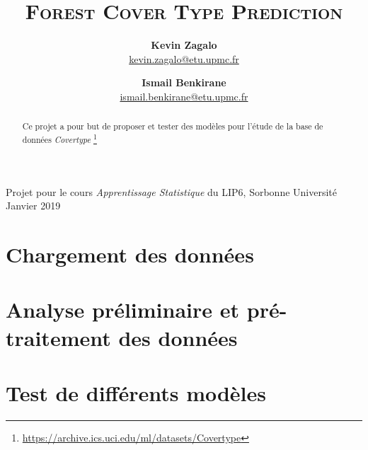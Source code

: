 \documentclass[12pt,a4paper]{article}
\title{\scshape \huge Forest Cover Type Prediction}
\author{\textbf{Kevin Zagalo} \\  \url{kevin.zagalo@etu.upmc.fr}  \and \textbf{Ismail Benkirane} \\ \url{ismail.benkirane@etu.upmc.fr}}
\date{}
\numberwithin{equation}{section}
\begin{document}
	\maketitle
	
{\small Projet pour le cours \textit{Apprentissage Statistique} du LIP6, Sorbonne Université} \hfill Janvier 2019
	
	\hrulefill

	\begin{abstract} {\footnotesize \justify Ce projet a pour but de proposer et tester des modèles pour l'étude de la base de données \textit{Covertype} \footnote{\url{https://archive.ics.uci.edu/ml/datasets/Covertype}}} \end{abstract}
	
	\hrulefill

	\tableofcontents
	
	\section{Chargement des données}
	
	\section{Analyse préliminaire et pré-traitement des données}
	
	\section{Test de différents modèles}
	
	
\end{document}
